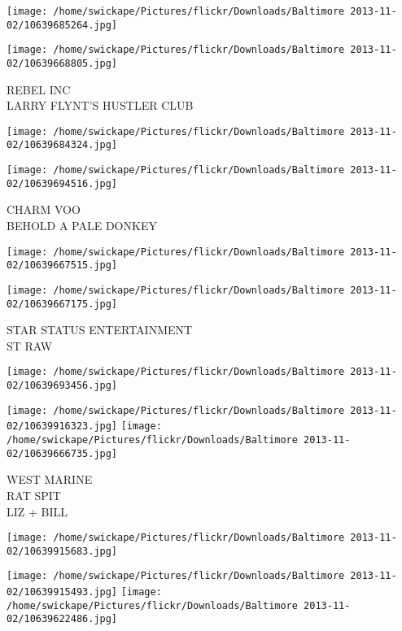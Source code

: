 \documentclass[10pt,letterpaper]{article}
\begin{document}
\texttt{[image: /home/swickape/Pictures/flickr/Downloads/Baltimore 2013-11-02/10639685264.jpg]}

\vspace{0.25in}
\texttt{[image: /home/swickape/Pictures/flickr/Downloads/Baltimore 2013-11-02/10639668805.jpg]}

REBEL INC\\
LARRY FLYNT'S HUSTLER CLUB\\
\pagebreak

\texttt{[image: /home/swickape/Pictures/flickr/Downloads/Baltimore 2013-11-02/10639684324.jpg]}

\vspace{0.25in}
\texttt{[image: /home/swickape/Pictures/flickr/Downloads/Baltimore 2013-11-02/10639694516.jpg]}

CHARM VOO\\
BEHOLD A PALE DONKEY\\
\pagebreak

\texttt{[image: /home/swickape/Pictures/flickr/Downloads/Baltimore 2013-11-02/10639667515.jpg]}

\vspace{0.25in}
\texttt{[image: /home/swickape/Pictures/flickr/Downloads/Baltimore 2013-11-02/10639667175.jpg]}

STAR STATUS ENTERTAINMENT\\
ST RAW\\
\pagebreak

\texttt{[image: /home/swickape/Pictures/flickr/Downloads/Baltimore 2013-11-02/10639693456.jpg]}

\vspace{0.25in}
\texttt{[image: /home/swickape/Pictures/flickr/Downloads/Baltimore 2013-11-02/10639916323.jpg]}
\texttt{[image: /home/swickape/Pictures/flickr/Downloads/Baltimore 2013-11-02/10639666735.jpg]}

WEST MARINE\\
RAT SPIT\\
LIZ + BILL\\
\pagebreak

\texttt{[image: /home/swickape/Pictures/flickr/Downloads/Baltimore 2013-11-02/10639915683.jpg]}

\vspace{0.25in}
\texttt{[image: /home/swickape/Pictures/flickr/Downloads/Baltimore 2013-11-02/10639915493.jpg]}
\texttt{[image: /home/swickape/Pictures/flickr/Downloads/Baltimore 2013-11-02/10639622486.jpg]}
\end{document}
